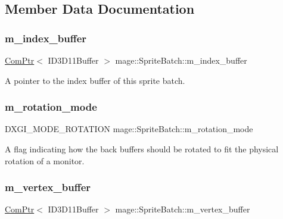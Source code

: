 \subsection{Member Data Documentation}
\hypertarget{classmage_1_1_sprite_batch_a3e0cfc2be21a137712b3670238aa91fa}{}\label{classmage_1_1_sprite_batch_a3e0cfc2be21a137712b3670238aa91fa} 
\subsubsection{\texorpdfstring{m\+\_\+index\+\_\+buffer}{m\_index\_buffer}}
{\footnotesize\ttfamily \hyperlink{namespacemage_ae74f374780900893caa5555d1031fd79}{Com\+Ptr}$<$ I\+D3\+D11\+Buffer $>$ mage\+::\+Sprite\+Batch\+::m\+\_\+index\+\_\+buffer\hspace{0.3cm}{\ttfamily [private]}}

A pointer to the index buffer of this sprite batch. \hypertarget{classmage_1_1_sprite_batch_ae062f178efe4a3af9c1573f8f8c4deee}{}\label{classmage_1_1_sprite_batch_ae062f178efe4a3af9c1573f8f8c4deee} 
\subsubsection{\texorpdfstring{m\+\_\+rotation\+\_\+mode}{m\_rotation\_mode}}
{\footnotesize\ttfamily D\+X\+G\+I\+\_\+\+M\+O\+D\+E\+\_\+\+R\+O\+T\+A\+T\+I\+ON mage\+::\+Sprite\+Batch\+::m\+\_\+rotation\+\_\+mode\hspace{0.3cm}{\ttfamily [private]}}

A flag indicating how the back buffers should be rotated to fit the physical rotation of a monitor. \hypertarget{classmage_1_1_sprite_batch_a748eb7f2f880e32ff4cfc0b7d6156de7}{}\label{classmage_1_1_sprite_batch_a748eb7f2f880e32ff4cfc0b7d6156de7} 
\subsubsection{\texorpdfstring{m\+\_\+vertex\+\_\+buffer}{m\_vertex\_buffer}}
{\footnotesize\ttfamily \hyperlink{namespacemage_ae74f374780900893caa5555d1031fd79}{Com\+Ptr}$<$ I\+D3\+D11\+Buffer $>$ mage\+::\+Sprite\+Batch\+::m\+\_\+vertex\+\_\+buffer\hspace{0.3cm}{\ttfamily [private]}}

